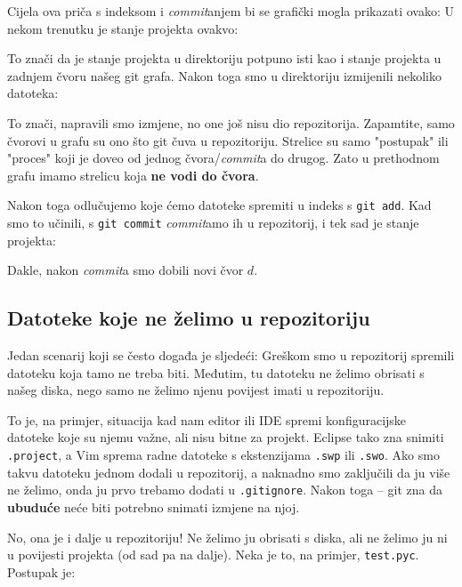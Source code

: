 Cijela ova priča s indeksom i \emph{commit}anjem bi se grafički mogla prikazati ovako:
U nekom trenutku je stanje projekta ovakvo:



To znači da je stanje projekta u direktoriju potpuno isti kao i stanje projekta u zadnjem čvoru našeg git grafa.
Nakon toga smo u direktoriju izmijenili nekoliko datoteka:



To znači, napravili smo izmjene, no one još nisu dio repozitorija.
Zapamtite, samo čvorovi u grafu su ono što git čuva u repozitoriju.
Strelice su samo "postupak" ili "proces" koji je doveo od jednog čvora/\emph{commit}a do drugog.
Zato u prethodnom grafu imamo strelicu koja \textbf{ne vodi do čvora}.

Nakon toga odlučujemo koje ćemo datoteke spremiti u indeks s \verb+git add+.
Kad smo to učinili, s \verb+git commit+ \emph{commit}amo ih u repozitorij, i tek sad je stanje projekta:



Dakle, nakon \emph{commit}a smo dobili novi čvor $d$.

\subsection*{Datoteke koje ne želimo u repozitoriju}

Jedan scenarij koji se često događa je sljedeći:
Greškom smo u repozitorij spremili datoteku koja tamo ne treba biti. 
Međutim, tu datoteku ne želimo obrisati s našeg diska, nego samo ne želimo njenu povijest imati u repozitoriju.

To je, na primjer, situacija kad nam editor ili IDE spremi konfiguracijske datoteke koje su njemu važne, ali nisu bitne za projekt.
Eclipse tako zna snimiti \verb+.project+, a Vim sprema radne datoteke s ekstenzijama \verb+.swp+ ili \verb+.swo+.
Ako smo takvu datoteku jednom dodali u repozitorij, a naknadno smo zaključili da ju više ne želimo, onda ju prvo trebamo dodati u \verb+.gitignore+.
Nakon toga -- git zna da \textbf{ubuduće} neće biti potrebno snimati izmjene na njoj.

No, ona je i dalje u repozitoriju!
Ne želimo ju obrisati s diska, ali ne želimo ju ni u povijesti projekta (od sad pa na dalje).
Neka je to, na primjer, \verb+test.pyc+.
Postupak je:

